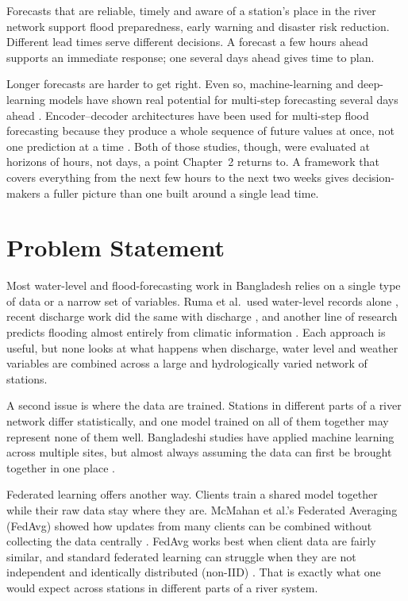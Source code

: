 Forecasts that are reliable, timely and aware of a station's place in the river
network support flood preparedness, early warning and disaster risk reduction.
Different lead times serve different decisions. A forecast a few hours ahead
supports an immediate response; one several days ahead gives time to plan.

Longer forecasts are harder to get right. Even so, machine-learning and
deep-learning models have shown real potential for multi-step forecasting
several days ahead \cite{Islam2026a,Ruma2023}. Encoder--decoder architectures
have been used for multi-step flood forecasting because they produce a whole
sequence of future values at once, not one prediction at a time
\cite{Kao2020,Cui2022}. Both of those studies, though, were evaluated at
horizons of hours, not days, a point Chapter~2 returns to. A framework that
covers everything from the next few hours to the next two weeks gives
decision-makers a fuller picture than one built around a single lead time.

\section{Problem Statement}
\label{sec:1.4}

Most water-level and flood-forecasting work in Bangladesh relies on a single
type of data or a narrow set of variables. Ruma et al.\ used water-level records
alone \cite{Ruma2023}, recent discharge work did the same with discharge
\cite{Islam2026a}, and another line of research predicts flooding almost
entirely from climatic information \cite{Rakin2023,Rajab2023,HemelSakib2024}.
Each approach is useful, but none looks at what happens when discharge, water
level and weather variables are combined across a large and hydrologically
varied network of stations.

A second issue is where the data are trained. Stations in different parts of a
river network differ statistically, and one model trained on all of them
together may represent none of them well. Bangladeshi studies have applied
machine learning across multiple sites, but almost always assuming the data can
first be brought together in one place \cite{Islam2026a,Islam2026b,Ruma2023}.

Federated learning offers another way. Clients train a shared model together
while their raw data stay where they are. McMahan et al.'s Federated Averaging
(FedAvg) showed how updates from many clients can be combined without collecting
the data centrally \cite{McMahan2017}. FedAvg works best when client data are
fairly similar, and standard federated learning can struggle when they are not
independent and identically distributed (non-IID) \cite{Zhu2021,Chen2025}. That
is exactly what one would expect across stations in different parts of a river
system.

